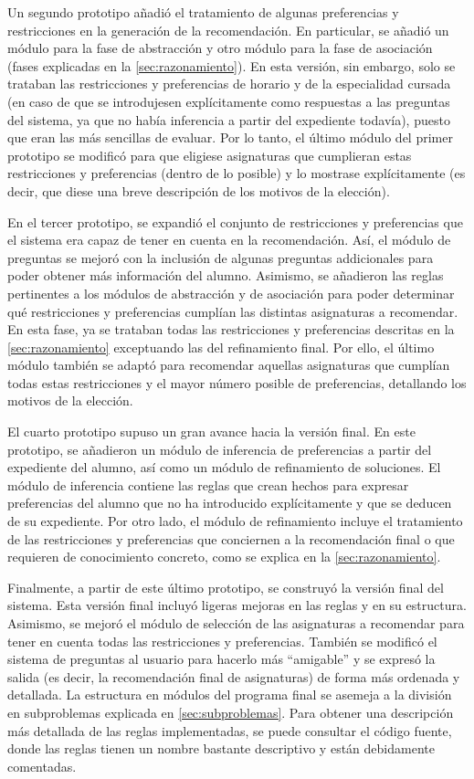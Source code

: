 Un segundo prototipo añadió el tratamiento de algunas preferencias y 
restricciones en la generación de la recomendación. En particular, se añadió 
un módulo para la fase de abstracción y otro módulo para la fase de asociación
(fases explicadas en la \autoref{sec:razonamiento}). En esta versión, sin 
embargo, solo se trataban las restricciones y preferencias de horario y de la 
especialidad cursada (en caso de que se introdujesen explícitamente como 
respuestas a las preguntas del sistema, ya que no había inferencia a partir 
del expediente todavía), puesto que eran las más sencillas de evaluar. Por lo 
tanto, el último módulo del primer prototipo se modificó para que eligiese 
asignaturas que cumplieran estas restricciones y preferencias (dentro de lo 
posible) y lo mostrase explícitamente (es decir, que diese una breve 
descripción de los motivos de la elección). 

En el tercer prototipo, se expandió el conjunto de restricciones y 
preferencias que el sistema era capaz de tener en cuenta en la recomendación. 
Así, el módulo de preguntas se mejoró con la inclusión de algunas preguntas 
addicionales para poder obtener más información del alumno. Asimismo, se 
añadieron las reglas pertinentes a los módulos de abstracción y de asociación 
para poder determinar qué restricciones y preferencias cumplían las distintas 
asignaturas a recomendar. En esta fase, ya se trataban todas las restricciones 
y preferencias descritas en la \autoref{sec:razonamiento} exceptuando las del 
refinamiento final. Por ello, el último módulo también se adaptó para 
recomendar aquellas asignaturas que cumplían todas estas restricciones y el 
mayor número posible de preferencias, detallando los motivos de la elección. 

El cuarto prototipo supuso un gran avance hacia la versión final. En este 
prototipo, se añadieron un módulo de inferencia de preferencias a partir del 
expediente del alumno, así como un módulo de refinamiento de soluciones. El 
módulo de inferencia contiene las reglas que crean hechos para expresar 
preferencias del alumno que no ha introducido explícitamente y que se deducen 
de su expediente. Por otro lado, el módulo de refinamiento incluye el 
tratamiento de las restricciones y preferencias que conciernen a la 
recomendación final o que requieren de conocimiento concreto, como se explica 
en la \autoref{sec:razonamiento}. 

Finalmente, a partir de este último prototipo, se construyó la versión final 
del sistema. Esta versión final incluyó ligeras mejoras en las reglas y en su 
estructura. Asimismo, se mejoró el módulo de selección de las asignaturas a 
recomendar para tener en cuenta todas las restricciones y preferencias. 
También se modificó el sistema de preguntas al usuario para hacerlo más 
``amigable'' y se expresó la salida (es decir, la recomendación final de 
asignaturas) de forma más ordenada y detallada. La estructura en módulos del 
programa final se asemeja a la división en subproblemas explicada en 
\autoref{sec:subproblemas}. Para obtener una descripción más detallada de las 
reglas implementadas, se puede consultar el código fuente, donde las reglas 
tienen un nombre bastante descriptivo y están debidamente comentadas.


\clearpage

